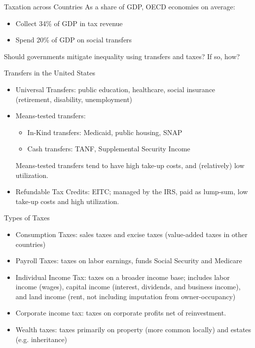 \documentclass[10pt]{extarticle}
\begin{document}
  \begin{problem}{Taxation across Countries}
    As a share of GDP, OECD economies on average:
    \begin{itemize}
      \item Collect 34\% of GDP in tax revenue
      \item Spend 20\% of GDP on social transfers
    \end{itemize}
    Should governments mitigate inequality using transfers and taxes? If so, how?
  \end{problem}
  \begin{problem}{Transfers in the United States}
    \begin{itemize}
      \item Universal Transfers: public education, healthcare, social insurance (retirement, disability, unemployment)
      \item Means-tested transfers:
        \begin{itemize}
          \item In-Kind transfers: Medicaid, public housing, SNAP
          \item Cash transfers: TANF, Supplemental Security Income
        \end{itemize}
        Means-tested transfers tend to have high take-up costs, and (relatively) low utilization.
      \item Refundable Tax Credits: EITC; managed by the IRS, paid as lump-sum, low take-up costs and high utilization.
    \end{itemize}
  \end{problem}
  \begin{problem}{Types of Taxes}
    \begin{itemize}
      \item Consumption Taxes: sales taxes and excise taxes (value-added taxes in other countries)
      \item Payroll Taxes: taxes on labor earnings, funds Social Security and Medicare
      \item Individual Income Tax: taxes on a broader income base; includes labor income (wages), capital income (interest, dividends, and business income), and land income (rent, not including imputation from owner-occupancy)
      \item Corporate income tax: taxes on corporate profits net of reinvestment.
      \item Wealth taxes: taxes primarily on property (more common locally) and estates (e.g. inheritance)
    \end{itemize}
  \end{problem}
\end{document}
